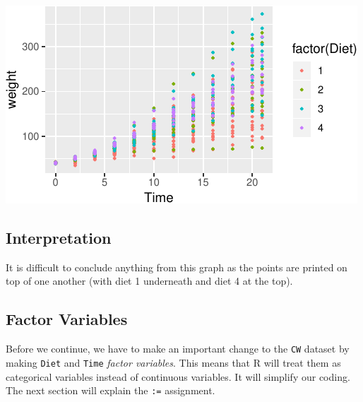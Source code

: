 \documentclass[letterpaperpaper,9pt,twocolumn,twoside,printwatermark=false]{pinp}
\begin{document}
\begin{center}\includegraphics{Getting-Started-in-R_files/figure-latex/addColourPlot-1} \end{center}

\hypertarget{interpretation-1}{%
\subsection{Interpretation}\label{interpretation-1}}

It is difficult to conclude anything from this graph as the points are
printed on top of one another (with diet 1 underneath and diet 4 at the
top).

\hypertarget{factor-variables}{%
\subsection{Factor Variables}\label{factor-variables}}

Before we continue, we have to make an important change to the
\texttt{CW} dataset by making \texttt{Diet} and \texttt{Time}
\emph{factor variables}. This means that R will treat them as
categorical variables instead of continuous variables. It will simplify
our coding. The next section will explain the \texttt{:=} assignment.
\end{document}
